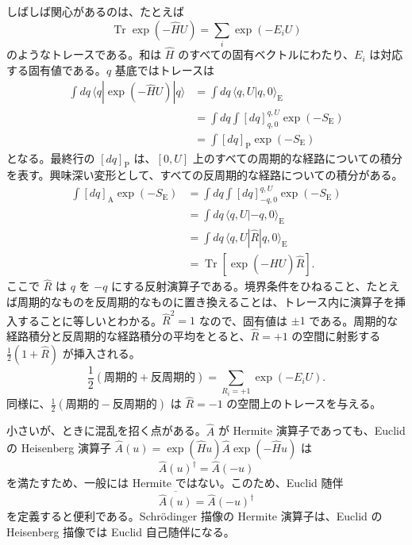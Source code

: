 しばしば関心があるのは、たとえば
\begin{equation}
\operatorname{Tr}\exp(-\hat HU)=\sum_i\exp(-E_iU)
\tag{A.1.32}\label{eq:A.1.32}
\end{equation}
のようなトレースである。和は $\hat H$ のすべての固有ベクトルにわたり、$E_i$ は対応する固有値である。$q$ 基底ではトレースは
\begin{equation}
\begin{aligned}
\int dq\,\langle q|\exp(-\hat HU)|q\rangle
&=\int dq\,\langle q,U|q,0\rangle_{\mathrm E}\\
&=\int dq\int[dq]_{q,0}^{q,U}\exp(-S_{\mathrm E})\\
&=\int[dq]_{\mathrm P}\exp(-S_{\mathrm E})
\end{aligned}
\tag{A.1.33}\label{eq:A.1.33}
\end{equation}
となる。最終行の $[dq]_{\mathrm P}$ は、$[0,U]$ 上のすべての周期的な経路についての積分を表す。興味深い変形として、すべての反周期的な経路についての積分がある。
\begin{equation}
\begin{aligned}
\int[dq]_{\mathrm A}\exp(-S_{\mathrm E})
&=\int dq\int[dq]_{-q,0}^{q,U}\exp(-S_{\mathrm E})\\
&=\int dq\,\langle q,U|-q,0\rangle_{\mathrm E}\\
&=\int dq\,\langle q,U|\hat R|q,0\rangle_{\mathrm E}\\
&=\operatorname{Tr}[\exp(-\hat HU)\hat R].
\end{aligned}
\tag{A.1.34}\label{eq:A.1.34}
\end{equation}
ここで $\hat R$ は $q$ を $-q$ にする反射演算子である。境界条件をひねること、たとえば周期的なものを反周期的なものに置き換えることは、トレース内に演算子を挿入することに等しいとわかる。$\hat R^2=1$ なので、固有値は $\pm1$ である。周期的な経路積分と反周期的な経路積分の平均をとると、$\hat R=+1$ の空間に射影する $\tfrac12(1+\hat R)$ が挿入される。
\begin{equation}
\frac12(\text{周期的}+\text{反周期的})
=\sum_{R_i=+1}\exp(-E_iU).
\tag{A.1.35}\label{eq:A.1.35}
\end{equation}
同様に、$\tfrac12(\text{周期的}-\text{反周期的})$ は $\hat R=-1$ の空間上のトレースを与える。

小さいが、ときに混乱を招く点がある。$\hat A$ が Hermite 演算子であっても、Euclid の Heisenberg 演算子 $\hat A(u)=\exp(\hat Hu)\hat A\exp(-\hat Hu)$ は
\begin{equation}
\hat A(u)^\dagger=\hat A(-u)
\tag{A.1.36}\label{eq:A.1.36}
\end{equation}
を満たすため、一般には Hermite ではない。このため、Euclid 随伴
\begin{equation}
\overline{\hat A(u)}=\hat A(-u)^\dagger
\tag{A.1.37}\label{eq:A.1.37}
\end{equation}
を定義すると便利である。Schrödinger 描像の Hermite 演算子は、Euclid の Heisenberg 描像では Euclid 自己随伴になる。

